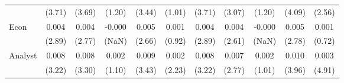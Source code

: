 \documentclass[
]{article}
\begin{document}
\begin{table}[H]
{\begin{tabular}{lcccccccccc}
   & (3.71) & (3.69) & (1.20) & (3.44) & (1.01) & (3.71) & (3.07) & (1.20) & (4.09) & (2.56) \\ 
  Econ & 0.004 & 0.004 & -0.000 & 0.005 & 0.001 & 0.004 & 0.004 & -0.000 & 0.005 & 0.001 \\ 
   & (2.89) & (2.77) & (NaN) & (2.66) & (0.92) & (2.89) & (2.61) & (NaN) & (2.78) & (0.72) \\ 
  Analyst & 0.008 & 0.008 & 0.002 & 0.009 & 0.002 & 0.008 & 0.007 & 0.002 & 0.010 & 0.003 \\ 
   & (3.22) & (3.30) & (1.10) & (3.43) & (2.23) & (3.22) & (2.77) & (1.01) & (3.96) & (4.91) \\ 
   \hline 
\end{tabular}
}
\end{table}
\end{document}
